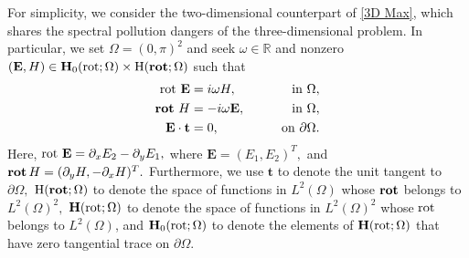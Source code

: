 




For simplicity, we consider the two-dimensional counterpart of \eqref{3D Max}, which shares the spectral pollution dangers of the three-dimensional problem. In particular, we set $\Omega = (0, \pi)^2$ and seek $\omega \in \mathbb{R}$ and nonzero $(\mathbf{E}, H) \in \mathbf{H}_0(\operatorname{rot}; \Omega) \times \text{H}(\operatorname{\mathbf{rot}};\Omega)$ such that 
\begin{subequations}\label{Max}
\begin{align}
    \operatorname{rot} \, \mathbf{E} &= i  \omega H, \qquad &\text{in } \Omega,\\
    \operatorname{\mathbf{rot}} \,H &= -i \omega \mathbf{E}, \qquad &\text{in } \Omega,\\
    \mathbf{E} \cdot \mathbf{t} &= 0, \qquad &\text{on } \partial \Omega. 
\end{align}
\end{subequations}
Here, $\operatorname{rot} \, \mathbf{E} = \partial_x E_2 - \partial_y E_1,$ where $\mathbf{E} = (E_1, E_2)^T\!,$ and $\operatorname{\mathbf{rot}} H = (\partial_y H, -\partial_x H)^T.$
Furthermore, we use $\mathbf{t}$ to denote the unit tangent to $\partial \Omega,$ $\text{H}(\operatorname{\mathbf{rot}}; \Omega)$ to denote the space of functions in $L^2(\Omega)$ whose $\operatorname{\mathbf{rot}}$ belongs to $L^2(\Omega)^2,$  $\mathbf{H}(\operatorname{rot} ; \Omega)$ to denote the space of functions in $L^2(\Omega)^2$ whose $\operatorname{rot}$ belongs to $L^2(\Omega)$, and $\mathbf{H}_0(\operatorname{rot} ; \Omega)$ to denote the elements of $\mathbf{H}(\operatorname{rot} ; \Omega)$ that have zero tangential trace on $\partial \Omega.$ 


